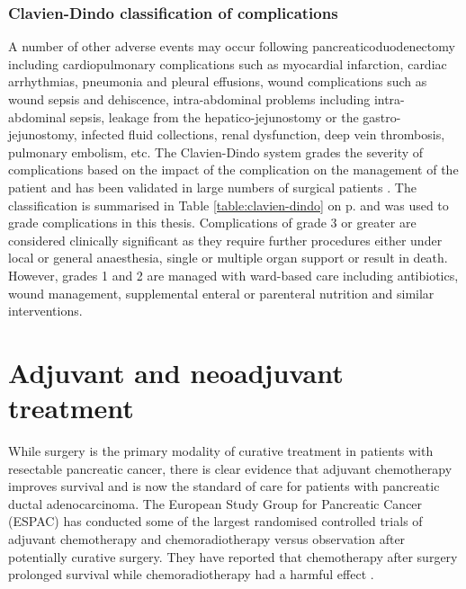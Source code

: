 \subsubsection{Clavien-Dindo classification of complications}

A number of other adverse events may occur following pancreaticoduodenectomy including cardiopulmonary complications such as myocardial infarction, cardiac arrhythmias, pneumonia and pleural effusions, wound complications such as wound sepsis and dehiscence, intra-abdominal problems including intra-abdominal sepsis, leakage from the hepatico-jejunostomy or the gastro-jejunostomy, infected fluid collections, renal dysfunction, deep vein thrombosis, pulmonary embolism, etc. 
The Clavien-Dindo system grades the severity of complications based on the impact of the complication on the management of the patient and has been validated in large numbers of surgical patients \parencite{clavien_clavien-dindo_2009, dindo_classification_2004}. 
The classification is summarised in Table \ref{table:clavien-dindo} on p\pageref{table:clavien-dindo}. 
and was used to grade complications in this thesis. 
Complications of grade 3 or greater are considered clinically significant as they require further procedures either under local or general anaesthesia, single or multiple organ support or result in death.
However, grades 1 and 2 are managed with ward-based care including antibiotics, wound management, supplemental enteral or parenteral nutrition and similar interventions.

\section{Adjuvant and neoadjuvant treatment}

While surgery is the primary modality of curative treatment in patients with resectable pancreatic cancer, there is clear evidence that adjuvant chemotherapy improves survival and is now the standard of care for patients with pancreatic ductal adenocarcinoma. 
The European Study Group for Pancreatic Cancer (ESPAC) has conducted some of the largest randomised controlled trials of adjuvant chemotherapy and chemoradiotherapy versus observation after potentially curative surgery.
They have reported that chemotherapy after surgery prolonged survival while chemoradiotherapy had a harmful effect \parencite{neoptolemos_adjuvant_2001, neoptolemos_randomized_2004, neoptolemos_adjuvant_2009, neoptolemos_adjuvant_2010}. 

